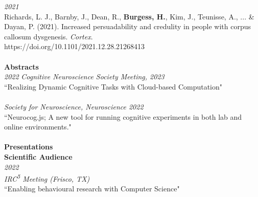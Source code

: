\documentclass{article}
\begin{document}
  \large\textit{2021} \\
  Richards, L. J., Barnby, J., Dean, R., \textbf{Burgess, H.}, Kim, J., Teunisse, A., ... \& Dayan, P. (2021). Increased persuadability and credulity in people with corpus callosum dysgenesis. \textit{Cortex}. \\
  https://doi.org/10.1101/2021.12.28.21268413 \\
  \\
                      
  \large\textbf{Abstracts} \\
  \large\textit{2022}
  \large\textit{Cognitive Neuroscience Society Meeting, 2023} \\
  ``Realizing Dynamic Cognitive Tasks with Cloud-based Computation"  \\
  \\

  \large\textit{Society for Neuroscience, Neuroscience 2022}\\
  ``Neurocog.js; A new tool for running cognitive experiments in both lab and online environments."  \\
  \\
                      
                      

                      
  \large\textbf{Presentations} \\
  \large\textbf{Scientific Audience} \\
  \large\textit{2022} \\
  \large\textit{IRC\textsuperscript{5} Meeting (Frisco, TX)} \\
  ``Enabling behavioural research with Computer Science" \\  
  \\
\end{document}
